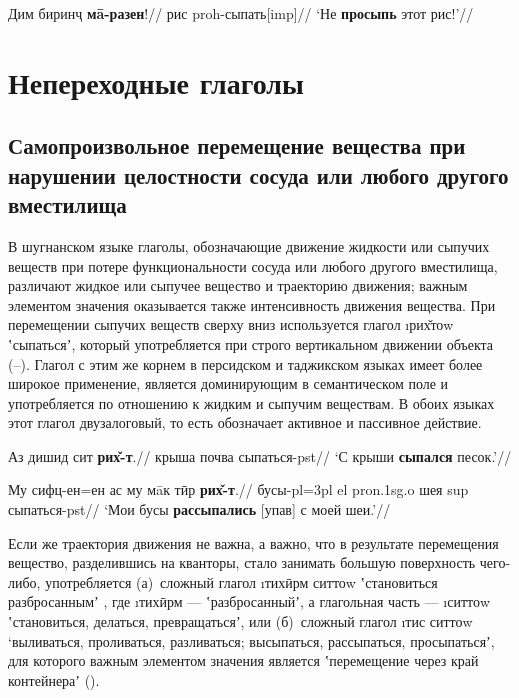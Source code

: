 \begingl
\gla Дим биринҷ \textbf{мā-разен}!//
 рис {\sc proh}-сыпать[{\sc imp}]//
\glft ‘Не \textbf{просыпь} этот рис!’//
\endgl \xe

\section{Непереходные глаголы} \label{pour-3}
\subsection{Самопроизвольное перемещение вещества при нарушении целостности сосуда или любого другого вместилища} \label{pour-31}

В шугнанском языке глаголы, обозначающие движение жидкости или сыпучих веществ при потере функциональности сосуда или любого другого вместилища, различают жидкое или сыпучее вещество и траекторию движения; важным элементом значения оказывается также интенсивность движения вещества. При перемещении сыпучих веществ сверху вниз используется глагол \i{рих̌тоw} ʽсыпатьсяʼ, который употребляется при строго вертикальном движении объекта (–). Глагол с этим же корнем  в персидском и таджикском языках имеет более широкое применение, является доминирующим в семантическом поле  и употребляется по отношению к жидким и сыпучим веществам. В обоих языках этот глагол двузалоговый, то есть обозначает активное и пассивное действие.

\begingl
\gla Аз дишид сит \textbf{рих̌-т}.//
 крыша почва сыпаться-{\sc pst}//
\glft ‘С крыши \textbf{сыпался} песок.’//
\endgl \xe

\begingl
\gla Му сифц-ен=ен ас му мāк тӣр \textbf{рих̌-т}.//
 бусы-{\sc pl=3pl} {\sc el} {\sc pron.1sg.o} шея {\sc sup} сыпаться-{\sc pst}//
\glft ‘Мои бусы \textbf{рассыпались} [упав] с моей шеи.’//
\endgl \xe

Если же траектория движения не важна, а важно, что в результате перемещения вещество, разделившись на кванторы, стало занимать большую поверхность чего-либо, употребляется (а)~сложный глагол \i{тихӣрм ситтоw} ʽстановиться разбросаннымʼ \parencite[83]{karamshoev1999}, где \i{тихӣрм} — ʽразбросанныйʼ, а глагольная часть — \i{ситтоw} ʽстановиться, делаться, превращатьсяʼ, или (б)~сложный глагол \i{тис ситтоw} ‘выливаться, проливаться, разливаться; высыпаться, рассыпаться, просыпатьсяʼ, для которого важным элементом значения является ʽперемещение через край контейнераʼ ().

